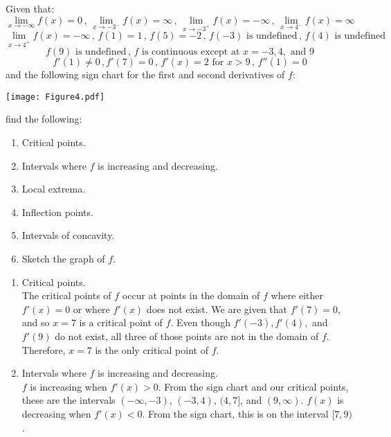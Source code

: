 \documentclass[handout, nooutcomes]{ximera}
\renewenvironment{freeResponse}{
\ifhandout\setbox0\vbox\bgroup\else
\begin{trivlist}\item[\hskip \labelsep\bfseries Solution:\hspace{2ex}]
\fi}
{\ifhandout\egroup\else
\end{trivlist}
\fi}
\begin{document}
\begin{problem}
Given that:
$$ \lim_{x \to - \infty} f(x) = 0 \, , \, \lim_{x \to -3^-} f(x) = \infty \, , \, \lim_{x \to -3^+} f(x) = - \infty \, , \, \lim_{x \to 4^-} f(x) = \infty $$
$$ \lim_{x \to 4^+} f(x) = -\infty \, , \, f(1) = 1 \, , \, f(5) = -2 \, , \, f(-3) \text{ is undefined} \, , \, f(4) \text{ is undefined} $$
$$ f(9) \text{ is undefined} \, , \, f \text{ is continuous except at } x=-3, 4, \text{ and } 9 $$
$$ f'(1) \ne 0\, ,f'(7) = 0 \, , \, f'(x) = 2 \text{ for } x > 9 \, , \, f''(1) = 0 $$
and the following sign chart for the first and second derivatives of $f$:

	\begin{image}
	\texttt{[image: Figure4.pdf]}
	\end{image}
	
find the following:
	\begin{enumerate}
	
	\item  Critical points.
	\item  Intervals where $f$ is increasing and decreasing.
	\item  Local extrema.
	\item  Inflection points.
	\item  Intervals of concavity.
	\item  Sketch the graph of $f$.
	
	\end{enumerate}
	
		\begin{freeResponse}
		
			\begin{enumerate}
			
			\item  Critical points. \\
			The critical points of $f$ occur at points in the domain of $f$ where either $f'(x)=0$ or where $f'(x)$ does not exist.  We are given that $f'(7)=0$, and so $x=7$ is a critical point of $f$.  Even though $f'(-3), f'(4),$ and $f'(9)$ do not exist, all three of those points are not in the domain of $f$.  Therefore, $x=7$ is the only critical point of $f$.  
			
			\item  Intervals where $f$ is increasing and decreasing.  \\
			$f$ is increasing when $f'(x)>0$.  From the sign chart and our critical points, these are the intervals $(-\infty ,-3)$, $(-3,4)$, $(4,7]$, and $(9,\infty )$. 
$f(x)$ is decreasing when $f'(x)<0$.  From the sign chart, this is on the interval $[7,9)$.
			

\end{enumerate}
\end{freeResponse}
\end{problem}
\end{document}
